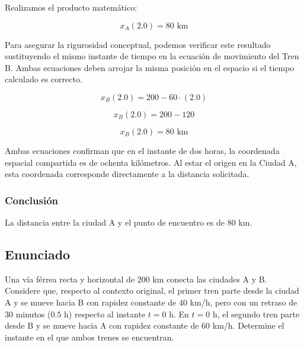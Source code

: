 \documentclass[12pt, a4paper]{article}
\begin{document}
Realizamos el producto matemático:

\begin{equation}
x_A(2.0) = 80 \text{ km}
\end{equation}

Para asegurar la rigurosidad conceptual, podemos verificar este resultado sustituyendo el mismo instante de tiempo en la ecuación de movimiento del Tren B. Ambas ecuaciones deben arrojar la misma posición en el espacio si el tiempo calculado es correcto.

\begin{equation}
x_B(2.0) = 200 - 60 \cdot (2.0)
\end{equation}

\begin{equation}
x_B(2.0) = 200 - 120
\end{equation}

\begin{equation}
x_B(2.0) = 80 \text{ km}
\end{equation}

Ambas ecuaciones confirman que en el instante de dos horas, la coordenada espacial compartida es de ochenta kilómetros. Al estar el origen en la Ciudad A, esta coordenada corresponde directamente a la distancia solicitada.

\subsubsection*{Conclusión}

La distancia entre la ciudad A y el punto de encuentro es de 80 km.
\newpage

\subsection*{Enunciado}

Una vía férrea recta y horizontal de 200 km conecta las ciudades A y B. Considere que, respecto al contexto original, el primer tren parte desde la ciudad A y se mueve hacia B con rapidez constante de 40 km/h, pero con un retraso de 30 minutos ($0.5 \text{ h}$) respecto al instante $t = 0 \text{ h}$. En $t = 0 \text{ h}$, el segundo tren parte desde B y se mueve hacia A con rapidez constante de 60 km/h. Determine el instante en el que ambos trenes se encuentran.

\vspace{0.5cm}

\begin{center}
\end{center}
\end{document}
